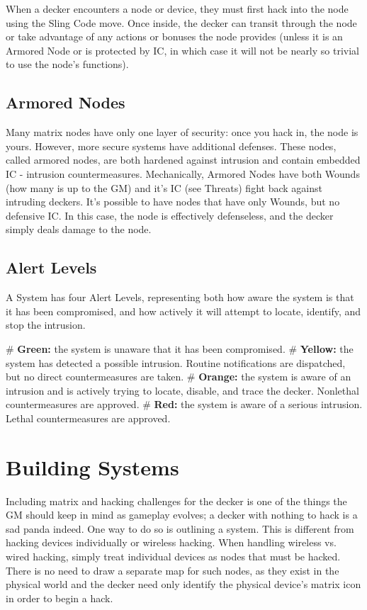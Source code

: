 When a decker encounters a node or device, they must first hack into the node using the Sling Code move. Once inside, the decker can transit through the node or take advantage of any actions or bonuses the node provides (unless it is an Armored Node or is protected by IC, in which case it will not be nearly so trivial to use the node’s functions).


\subsection{Armored Nodes}

Many matrix nodes have only one layer of security: once you hack in, the node is yours. However, more secure systems have additional defenses. These nodes, called armored nodes, are both hardened against intrusion and contain embedded IC - intrusion countermeasures. Mechanically, Armored Nodes have both Wounds (how many is up to the GM) and it's IC (see Threats) fight back against intruding deckers. It’s possible to have nodes that have only Wounds, but no defensive IC. In this case, the node is effectively defenseless, and the decker simply deals damage to the node.


\subsection{Alert Levels}

A System has four Alert Levels, representing both how aware the system is that it has been compromised, and how actively it will attempt to locate, identify, and stop the intrusion.
    \begin{easylist}
        # \textbf{Green:} the system is unaware that it has been compromised.
        # \textbf{Yellow:} the system has detected a possible intrusion. Routine notifications are dispatched, but no direct countermeasures are taken.
        # \textbf{Orange:} the system is aware of an intrusion and is actively trying to locate, disable, and trace the decker. Nonlethal countermeasures are approved.
        # \textbf{Red:} the system is aware of a serious intrusion. Lethal countermeasures are approved.
    \end{easylist}



\section{Building Systems}

Including matrix and hacking challenges for the decker is one of the things the GM should keep in mind as gameplay evolves; a decker with nothing to hack is a sad panda indeed. One way to do so is outlining a system. This is different from hacking devices individually or wireless hacking. When handling wireless vs. wired hacking, simply treat individual devices as nodes that must be hacked. There is no need to draw a separate map for such nodes, as they exist in the physical world and the decker need only identify the physical device’s matrix icon in order to begin a hack.